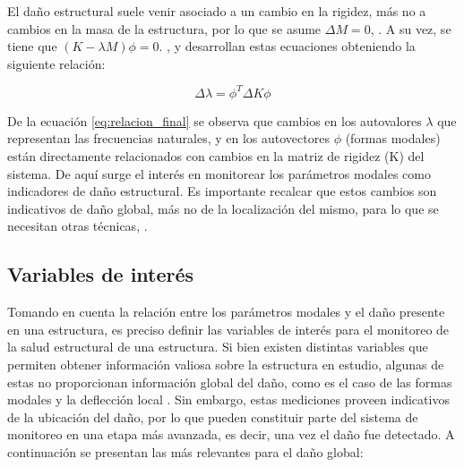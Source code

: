 El daño estructural suele venir asociado a un cambio en la rigidez, más no a cambios en la masa de la estructura, por lo que se asume $\Delta M = 0$, \citep{hearn1991modal}. A su vez, se tiene que $(K - \lambda M)\phi = 0$. \citet{mohamed2014}, \citet{shi1998structural} y \citet{hearn1991modal} desarrollan estas ecuaciones obteniendo la siguiente relación:

\begin{equation} \label{eq:relacion_final}
    \Delta\lambda = \phi^T \Delta K \phi
\end{equation}

De la ecuación \ref{eq:relacion_final} se observa que cambios en los autovalores $\lambda$ que representan las frecuencias naturales, y en los autovectores $\phi$ (formas modales) están directamente relacionados con cambios en la matriz de rigidez (K) del sistema. De aquí surge el interés en monitorear los parámetros modales como indicadores de daño estructural. Es importante recalcar que estos cambios son indicativos de daño global, más no de la localización del mismo, para lo que se necesitan otras técnicas, \citep{mohamed2014}.

\subsection{Variables de interés}

Tomando en cuenta la relación entre los parámetros modales y el daño presente en una estructura, es preciso definir las variables de interés para el monitoreo de la salud estructural de una estructura. Si bien existen distintas variables que permiten obtener información valiosa sobre la estructura en estudio, algunas de estas no proporcionan información global del daño, como es el caso de las formas modales y la deflección local \citep{rytter1993vibration}. Sin embargo, estas mediciones proveen indicativos de la ubicación del daño, por lo que pueden constituir parte del sistema de monitoreo en una etapa más avanzada, es decir, una vez el daño fue detectado. A continuación se presentan las más relevantes para el daño global:

